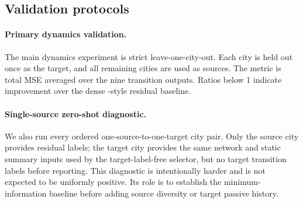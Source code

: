 \begin{table}[t]
\centering
\scriptsize
\resizebox{\textwidth}{!}{}
\caption{Target-construction audit. The evidence columns identify observed, apportioned, and schedule-derived components; route-level residual quantiles show that simulator-target gaps are heterogeneous rather than a single constant correction.}
\label{tab:target-audit-main}
\end{table}

\subsection{Validation protocols}

\paragraph{Primary dynamics validation.}
The main dynamics experiment is strict leave-one-city-out.
Each city is held out once as the target, and all remaining cities are used as sources.
The metric is total MSE averaged over the nine transition outputs.
Ratios below 1 indicate improvement over the dense \Htwo-style residual baseline.

\paragraph{Single-source zero-shot diagnostic.}
We also run every ordered one-source-to-one-target city pair.
Only the source city provides residual labels; the target city provides the same network and static summary inputs used by the target-label-free selector, but no target transition labels before reporting.
This diagnostic is intentionally harder and is not expected to be uniformly positive.
Its role is to establish the minimum-information baseline before adding source diversity or target passive history.

